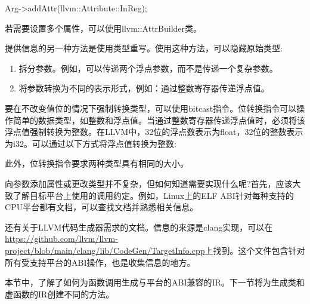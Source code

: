 \begin{cpp}
Arg->addAttr(llvm::Attribute::InReg);
\end{cpp}

若需要设置多个属性，可以使用llvm::AttrBuilder类。

提供信息的另一种方法是使用类型重写。使用这种方法，可以隐藏原始类型:

\begin{enumerate}
\item
拆分参数。例如，可以传递两个浮点参数，而不是传递一个复杂参数。

\item
将参数转换为不同的表示形式，例如：通过整数寄存器传递浮点值。
\end{enumerate}

要在不改变值位的情况下强制转换类型，可以使用bitcast指令。位转换指令可以操作简单的数据类型，如整数和浮点值。当通过整数寄存器传递浮点值时，必须将该浮点值强制转换为整数。在LLVM中，32位的浮点数表示为float，32位的整数表示为i32。可以通过以下方式将浮点值转换为整数:

\begin{shell}
\end{shell}

此外，位转换指令要求两种类型具有相同的大小。

向参数添加属性或更改类型并不复杂，但如何知道需要实现什么呢?首先，应该大致了解目标平台上使用的调用约定。例如，Linux上的ELF ABI针对每种支持的CPU平台都有文档，可以查找文档并熟悉相关信息。

还有关于LLVM代码生成器需求的文档。信息的来源是clang实现，可以在\url{https://github.com/llvm/llvm-project/blob/main/clang/lib/CodeGen/TargetInfo.cpp}上找到。这个文件包含针对所有受支持平台的ABI操作，也是收集信息的地方。

本节中，了解了如何为函数调用生成与平台的ABI兼容的IR。下一节将为生成类和虚函数的IR创建不同的方法。




















































